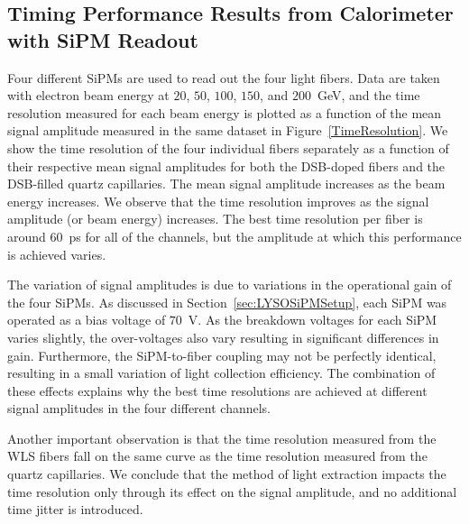 \subsection{Timing Performance Results from Calorimeter with SiPM Readout}
\label{sec:beamtiming}

Four different SiPMs are used to read out the four light fibers. Data are taken with electron
beam energy at $20$, $50$, $100$, $150$, and $200$~GeV, and the time resolution
measured for each beam energy is plotted as a function of the mean signal
amplitude measured in the same dataset in Figure~\ref{TimeResolution}. We show
the time resolution of the four individual fibers separately as a function of their
respective mean signal amplitudes for both the DSB-doped fibers and the DSB-filled
quartz capillaries. The mean signal amplitude increases as the beam energy 
increases. We observe that the time resolution improves as the 
signal amplitude (or beam energy) increases. The best time resolution per fiber is around
$60$~ps for all of the channels, but the amplitude at which this performance is
achieved varies. 

The variation of signal amplitudes is due to variations in the operational gain
of the four SiPMs. As discussed in Section~\ref{sec:LYSOSiPMSetup}, each SiPM
was operated as a bias voltage of $70$~V. As the breakdown voltages for each
SiPM varies slightly, the over-voltages also vary resulting in significant
differences in gain. Furthermore, the SiPM-to-fiber coupling may not be perfectly
identical, resulting in a small variation of light collection efficiency. The combination of these effects
explains why the best time resolutions are achieved at different signal amplitudes in the four
different channels.

Another important observation is that the time resolution
measured from the WLS fibers fall on the same curve as the time
resolution measured from the quartz capillaries. We conclude that the method of
light extraction impacts the time resolution only through its effect on the
signal amplitude, and no additional time jitter is introduced. 


